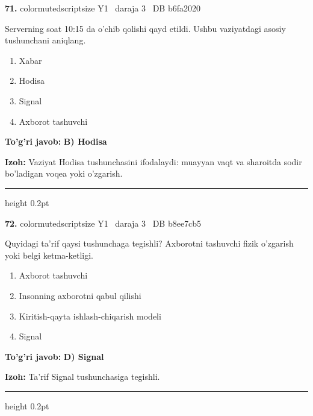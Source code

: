 \documentclass[10pt,a4paper,oneside]{article}
\begin{document}
\noindent\textbf{\color{ink}71.}  {color{muted}scriptsize Y1 \textbullet\ daraja 3 \textbullet\ DB b6fa2020}
\par
Serverning soat 10:15 da o'chib qolishi qayd etildi. Ushbu vaziyatdagi asosiy tushunchani aniqlang.
\begin{enumerate}[label=\Alph*),leftmargin=9mm]
\item Xabar
\item Hodisa
\item Signal
\item Axborot tashuvchi
\end{enumerate}
\begin{tcolorbox}[enhanced,breakable,colback=teal!4,colframe=teal!50!black,boxrule=0.5pt,arc=1.1mm,left=3mm,right=3mm,top=1.7mm,bottom=1.7mm,before skip=2mm,after skip=2mm]
\textbf{\color{teal}To'g'ri javob:} \textbf{B) Hodisa}
\par\smallskip
\textbf{Izoh:} Vaziyat Hodisa tushunchasini ifodalaydi: muayyan vaqt va sharoitda sodir bo'ladigan voqea yoki o'zgarish.
\end{tcolorbox}
\vspace{2mm}\hrule height 0.2pt \vspace{3mm}

\noindent\textbf{\color{ink}72.}  {color{muted}scriptsize Y1 \textbullet\ daraja 3 \textbullet\ DB b8ee7cb5}
\par
Quyidagi ta'rif qaysi tushunchaga tegishli? Axborotni tashuvchi fizik o'zgarish yoki belgi ketma-ketligi.
\begin{enumerate}[label=\Alph*),leftmargin=9mm]
\item Axborot tashuvchi
\item Insonning axborotni qabul qilishi
\item Kiritish-qayta ishlash-chiqarish modeli
\item Signal
\end{enumerate}
\begin{tcolorbox}[enhanced,breakable,colback=teal!4,colframe=teal!50!black,boxrule=0.5pt,arc=1.1mm,left=3mm,right=3mm,top=1.7mm,bottom=1.7mm,before skip=2mm,after skip=2mm]
\textbf{\color{teal}To'g'ri javob:} \textbf{D) Signal}
\par\smallskip
\textbf{Izoh:} Ta'rif Signal tushunchasiga tegishli.
\end{tcolorbox}
\vspace{2mm}\hrule height 0.2pt \vspace{3mm}
\end{document}
